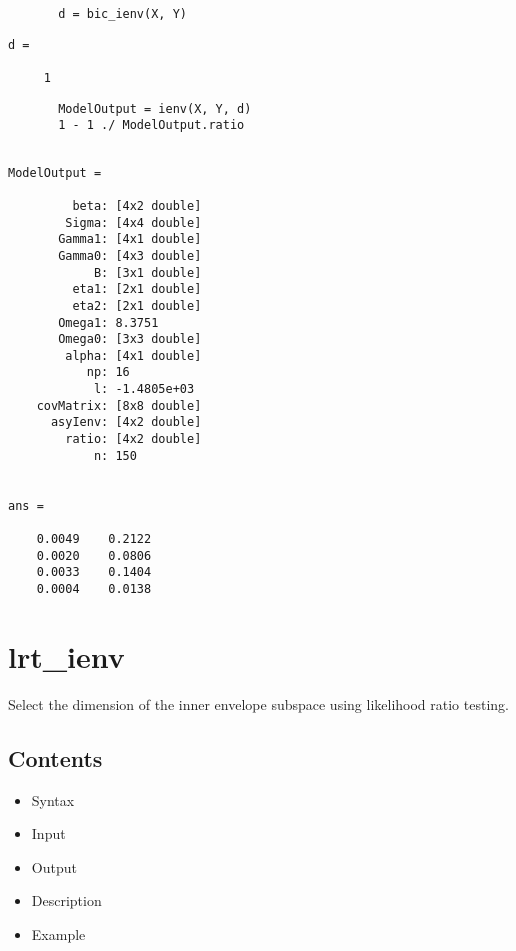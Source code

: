 \documentclass[a4paper,11pt,openany]{memoir}
\begin{document}
\begin{verbatim}       d = bic_ienv(X, Y)\end{verbatim}
        \color{lightgray}\ttfamily \begin{verbatim}
d =

     1
\end{verbatim} \rmfamily
\color{black}
\begin{verbatim}       ModelOutput = ienv(X, Y, d)
       1 - 1 ./ ModelOutput.ratio\end{verbatim}
        \color{lightgray}\ttfamily \begin{verbatim}

ModelOutput = 

         beta: [4x2 double]
        Sigma: [4x4 double]
       Gamma1: [4x1 double]
       Gamma0: [4x3 double]
            B: [3x1 double]
         eta1: [2x1 double]
         eta2: [2x1 double]
       Omega1: 8.3751
       Omega0: [3x3 double]
        alpha: [4x1 double]
           np: 16
            l: -1.4805e+03
    covMatrix: [8x8 double]
      asyIenv: [4x2 double]
        ratio: [4x2 double]
            n: 150


ans =

    0.0049    0.2122
    0.0020    0.0806
    0.0033    0.1404
    0.0004    0.0138

\end{verbatim} \rmfamily
\color{black}


\newpage


\rmfamily
\color{black}\section{lrt\_ienv}

\begin{par}
Select the dimension of the inner envelope subspace using likelihood ratio testing.
\end{par} \vspace{1em}

\subsection*{Contents}

\begin{itemize}
\setlength{\itemsep}{-1ex}
   \item Syntax
   \item Input
   \item Output
   \item Description
   \item Example
\end{itemize}
\end{document}
